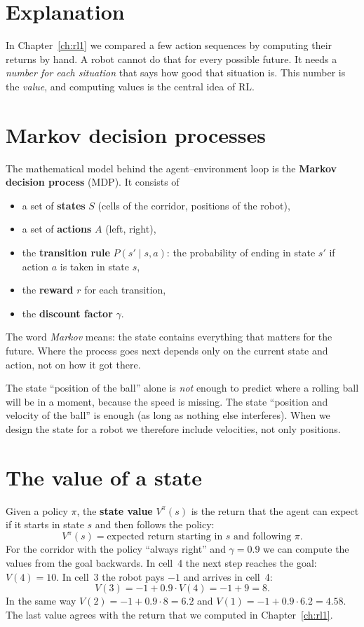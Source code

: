 \label{ch:rl2}

\section*{Explanation}
In Chapter~\ref{ch:rl1} we compared a few action sequences by computing their returns by hand. A robot cannot do that for every possible future. It needs a \emph{number for each situation} that says how good that situation is. This number is the \emph{value}, and computing values is the central idea of RL.

\section*{Markov decision processes}
The mathematical model behind the agent--environment loop is the \textbf{Markov decision process} (MDP). It consists of
\begin{itemize}[nosep]
  \item a set of \textbf{states} $S$ (cells of the corridor, positions of the robot),
  \item a set of \textbf{actions} $A$ (left, right),
  \item the \textbf{transition rule} $P(s'\mid s,a)$: the probability of ending in state $s'$ if action $a$ is taken in state $s$,
  \item the \textbf{reward} $r$ for each transition,
  \item the \textbf{discount factor} $\gamma$.
\end{itemize}
The word \emph{Markov} means: the state contains everything that matters for the future. Where the process goes next depends only on the current state and action, not on how it got there.

\begin{example}
The state ``position of the ball'' alone is \emph{not} enough to predict where a rolling ball will be in a moment, because the speed is missing. The state ``position and velocity of the ball'' is enough (as long as nothing else interferes). When we design the state for a robot we therefore include velocities, not only positions.
\end{example}

\section*{The value of a state}
Given a policy $\pi$, the \textbf{state value} $V^\pi(s)$ is the return that the agent can expect if it starts in state $s$ and then follows the policy:
\[
V^\pi(s)=\text{expected return starting in } s \text{ and following } \pi .
\]
For the corridor with the policy ``always right'' and $\gamma=0.9$ we can compute the values from the goal backwards. In cell~4 the next step reaches the goal: $V(4)=10$. In cell~3 the robot pays $-1$ and arrives in cell~4:
\[
V(3)=-1+0.9\cdot V(4)=-1+9=8 .
\]
In the same way $V(2)=-1+0.9\cdot8=6.2$ and $V(1)=-1+0.9\cdot6.2=4.58$. The last value agrees with the return that we computed in Chapter~\ref{ch:rl1}.

